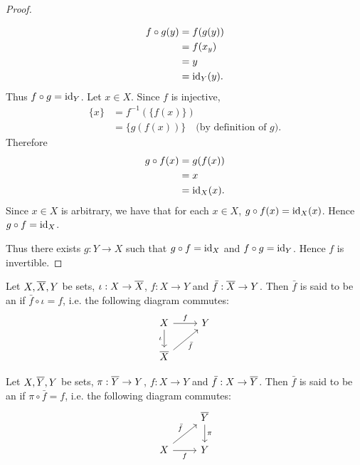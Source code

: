 \documentclass{book}
\begin{document}
\begin{proof}
\begin{itemize}
			\begin{align*}
				f \circ g(y) 
				& = f(g(y)) \\
				& = f(x_y) \\
				& = y \\
				& = \operatorname{id}_Y(y).
			\end{align*}
			Thus $f \circ g = \operatorname{id}_Y$. Let $x \in X$. Since $f$ is injective,
			\begin{align*}
				\{x\}
				& = f^{-1}(\{f(x)\}) \\
				& = \{g(f(x))\} \quad \text{(by definition of $g$)}.
			\end{align*}
			Therefore
			\begin{align*}
				g \circ f(x)
				& = g(f(x)) \\
				& = x \\
				& = \operatorname{id}_X(x).
			\end{align*}
			Since  $x \in X$ is arbitrary, we have that for each $x \in X$, $g \circ f(x) = \operatorname{id}_X(x)$. Hence $g \circ f = \operatorname{id}_X$.
		\end{itemize}
		Thus there exists $g:Y \rightarrow X$ such that $g \circ f = \operatorname{id}_X$ and $f \circ g = \operatorname{id}_Y$. Hence $f$ is invertible.  
	\end{proof}
	
	\begin{defn}
		Let $X, \overline{X}, Y$ be sets, $\iota:X \rightarrow \overline{X}$, $f:X \rightarrow Y$ and $\bar{f}: \overline{X} \rightarrow Y$. Then $\bar{f}$ is said to be an  if $\bar{f} \circ \iota = f$, i.e. the following diagram commutes:  
		\[ 
		\begin{tikzcd}
			X  \arrow[d, "\iota"'] \arrow[r, "f"] & Y \\
			\ol{X} \arrow[ur, "\bar{f}"'] 
		\end{tikzcd}
		\] 
	\end{defn}
	
	\begin{defn}
		Let $X, \overline{Y}, Y$ be sets, $\pi:\overline{Y} \rightarrow Y$, $f:X \rightarrow Y$ and $\bar{f}: X \rightarrow \overline{Y}$. Then $\bar{f}$ is said to be an  if $\pi \circ \bar{f} = f$, i.e. the following diagram commutes:  
		\[ 
		\begin{tikzcd}
			                                       & \ol{Y}  \arrow[d, "\pi"] \\
			X \arrow[r, "f"'] \arrow[ur, "\bar{f}"] & Y \\
		\end{tikzcd}
		\] 
	\end{defn}
	
\end{document}
